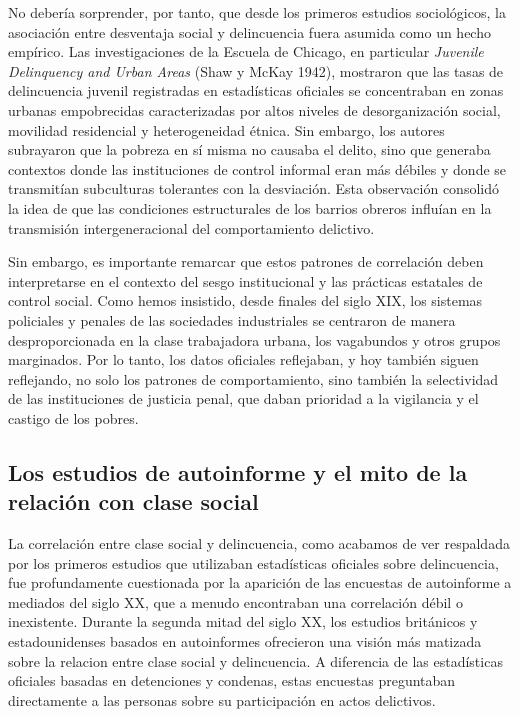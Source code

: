 \documentclass[
  spanish,
  letterpaper,
  DIV=11,
  numbers=noendperiod]{scrreprt}
\begin{document}
No debería sorprender, por tanto, que desde los primeros estudios
sociológicos, la asociación entre desventaja social y delincuencia fuera
asumida como un hecho empírico. Las investigaciones de la Escuela de
Chicago, en particular \emph{Juvenile Delinquency and Urban Areas} (Shaw
y McKay 1942), mostraron que las tasas de delincuencia juvenil
registradas en estadísticas oficiales se concentraban en zonas urbanas
empobrecidas caracterizadas por altos niveles de desorganización social,
movilidad residencial y heterogeneidad étnica. Sin embargo, los autores
subrayaron que la pobreza en sí misma no causaba el delito, sino que
generaba contextos donde las instituciones de control informal eran más
débiles y donde se transmitían subculturas tolerantes con la desviación.
Esta observación consolidó la idea de que las condiciones estructurales
de los barrios obreros influían en la transmisión intergeneracional del
comportamiento delictivo.

Sin embargo, es importante remarcar que estos patrones de correlación
deben interpretarse en el contexto del sesgo institucional y las
prácticas estatales de control social. Como hemos insistido, desde
finales del siglo XIX, los sistemas policiales y penales de las
sociedades industriales se centraron de manera desproporcionada en la
clase trabajadora urbana, los vagabundos y otros grupos marginados. Por
lo tanto, los datos oficiales reflejaban, y hoy también siguen
reflejando, no solo los patrones de comportamiento, sino también la
selectividad de las instituciones de justicia penal, que daban prioridad
a la vigilancia y el castigo de los pobres.

\subsection{Los estudios de autoinforme y el mito de la relación con
clase
social}\label{los-estudios-de-autoinforme-y-el-mito-de-la-relaciuxf3n-con-clase-social}

La correlación entre clase social y delincuencia, como acabamos de ver
respaldada por los primeros estudios que utilizaban estadísticas
oficiales sobre delincuencia, fue profundamente cuestionada por la
aparición de las encuestas de autoinforme a mediados del siglo XX, que a
menudo encontraban una correlación débil o inexistente. Durante la
segunda mitad del siglo XX, los estudios británicos y estadounidenses
basados en autoinformes ofrecieron una visión más matizada sobre la
relacion entre clase social y delincuencia. A diferencia de las
estadísticas oficiales basadas en detenciones y condenas, estas
encuestas preguntaban directamente a las personas sobre su participación
en actos delictivos.
\end{document}

